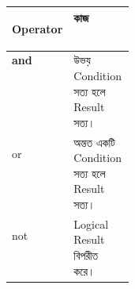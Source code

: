 \begin{tabularx}
{\linewidth}
{
|>{\bfseries\centering\arraybackslash}p{0.18\linewidth}
|Y|
}

\hline
{}

\textbf{Operator}
&
\textbf{কাজ}
\\
\hline

\textenglish{\ttfamily and}
&
উভয় Condition সত্য হলে Result সত্য।
\\
\hline

\textenglish{\ttfamily or}
&
অন্তত একটি Condition সত্য হলে Result সত্য।
\\
\hline

\textenglish{\ttfamily not}
&
Logical Result বিপরীত করে।
\\
\hline

\end{tabularx}


